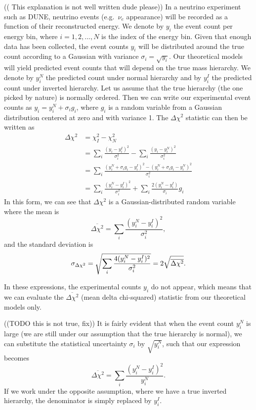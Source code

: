 (( This explanation is not well written dude please))
In a neutrino experiment such as DUNE, neutrino events (e.g.~$\nu_e$
appearance) will be recorded as a
function of their reconstructed energy. We denote by $y_i$ the event count per
energy bin,
where $i = 1, 2, ..., N$ is the index of the energy bin.
Given that enough data has been collected,
the event counts $y_i$ will be distributed around the true count
according to a Gaussian with variance $\sigma_i=\sqrt{y_i}$. 
Our theoretical models will yield predicted event counts that will depend on
the true mass hierarchy.  We denote by $y^N_i$ the predicted count under normal
hierarchy and by $y^I_i$ the predicted count under inverted hierarchy.
Let us assume that the true hierarchy (the one picked by nature) is normally
ordered. Then we can write our experimental event counts as $y_i = y^N_i +
\sigma_i g_i$, where $g_i$ is a random variable from a Gaussian distribution
centered at zero and with variance 1.
The $\Delta \chi^2$ statistic can then be written as
\begin{align*}
	\Delta \chi^2 &= \chi_I^2 - \chi_N^2\\
	&= \sum_i \frac{(y_i - y^I_i)^2}{\sigma_i^2} - \sum_i \frac{(y_i -
	y^N_i)^2}{\sigma_i^2}\\
	&= \sum_i \frac{(y^N_i + \sigma_i g_i - y^I_i)^2 - (y^N_i + \sigma_i g_i -
	y^N_i)^2}{\sigma_i^2}\\
	&= \sum_i \frac{(y^N_i - y^I_i)^2}{\sigma_i^2} + \sum_i \frac{2(y^N_i -
	y^I_i)}{\sigma_i} g_i
\end{align*}
In this form, we can see that $\Delta \chi^2$ is a Gaussian-distributed random
variable where the mean is
$$\overline{\Delta\chi^2} = \sum_i \frac{(y^N_i - y^I_i)^2}{\sigma_i^2},$$
and the standard deviation is
$$\sigma_{\Delta\chi^2} = \sqrt{\sum_i \frac{4(y^N_i - y^I_i)^2}{\sigma_i^2}}\\
= 2\sqrt{\overline{\Delta\chi^2}}.$$

In these expressions, the experimental counts $y_i$ do not appear, which means
that we can evaluate the $\overline{\Delta\chi^2}$ (mean delta chi-squared)
statistic from our theoretical models only.

((TODO this is not true, fix))
It is fairly evident\cite{qian} that when the
event count $y^N_i$ is large (we are still under our assumption that the true hierarchy
is normal), we can substitute the statistical uncertainty $\sigma_i$ by
$\sqrt{y^N_i}$, such that our expression becomes
$$\overline{\Delta\chi^2} = \sum_i \frac{(y^N_i - y^I_i)^2}{y^N_i}.$$
If we work under the opposite assumption, where we have a true inverted
hierarchy, the denominator is simply replaced by $y^I_i$. 

